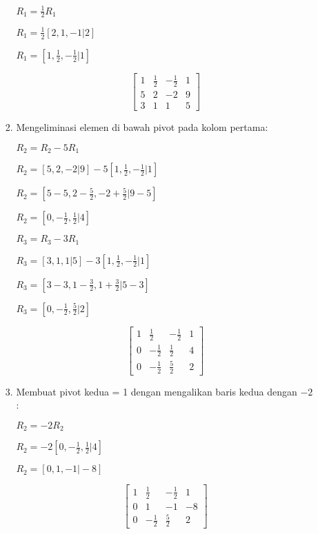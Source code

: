 \documentclass[a4paper]{article}
\begin{document}
\begin{enumerate}[itemsep=1em,leftmargin=*]
\begin{enumerate}
\begin{enumerate}
      \(R_1 = \frac{1}{2}R_1\)

      \(R_1 = \frac{1}{2}[2, 1, -1 \vert 2]\)

      \(R_1 = [1, \frac{1}{2}, -\frac{1}{2} \vert 1]\)

      \[
      \left[\begin{array}{ccc|c}
      1 & \frac{1}{2} & -\frac{1}{2} & 1 \\
      5 & 2 & -2 & 9 \\
      3 & 1 & 1 & 5
      \end{array}\right]
      \]
      \item Mengeliminasi elemen di bawah pivot pada kolom pertama:

      \(R_2 = R_2 - 5R_1\)

      \(R_2 = [5, 2, -2 \vert 9] - 5[1, \frac{1}{2}, -\frac{1}{2} \vert 1]\)

      \(R_2 = [5 - 5, 2 - \frac{5}{2}, -2 + \frac{5}{2} \vert 9 - 5]\)

      \(R_2 = [0, -\frac{1}{2}, \frac{1}{2} \vert 4]\)

      \vspace{1em}

      \(R_3 = R_3 - 3R_1\)

      \(R_3 = [3, 1, 1 \vert 5] - 3[1, \frac{1}{2}, -\frac{1}{2} \vert 1]\)

      \(R_3 = [3 - 3, 1 - \frac{3}{2}, 1 + \frac{3}{2} \vert 5 - 3]\)

      \(R_3 = [0, -\frac{1}{2}, \frac{5}{2} \vert 2]\)


      \[
      \left[\begin{array}{ccc|c}
      1 & \frac{1}{2} & -\frac{1}{2} & 1 \\
      0 & -\frac{1}{2} & \frac{1}{2} & 4 \\
      0 & -\frac{1}{2} & \frac{5}{2} & 2
      \end{array}\right]
      \]
      \item Membuat pivot kedua = 1 dengan mengalikan baris kedua dengan \(-2\):
      
      \(R_2 = -2R_2\)

      \(R_2 = -2[0, -\frac{1}{2}, \frac{1}{2} \vert 4]\)

      \(R_2 = [0, 1, -1 \vert -8]\)

      \[
      \left[\begin{array}{ccc|c}
      1 & \frac{1}{2} & -\frac{1}{2} & 1 \\
      0 & 1 & -1 & -8 \\
      0 & -\frac{1}{2} & \frac{5}{2} & 2
      \end{array}\right]
      \]


\end{enumerate}
\end{enumerate}
\end{enumerate}
\end{document}
